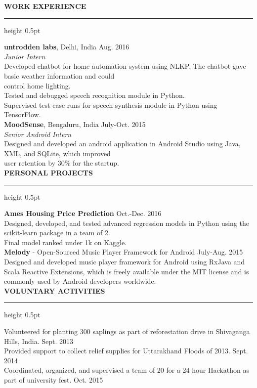 \documentclass[a4paper]{article}
\newcommand{\myline}{\par
  \kern2pt %
  \hrule height 0.5pt
  \kern2pt %
}
\newcommand{\mybullet}{
	\indent \textbullet \hspace*{2mm}
}
\begin{document}
	\smallskip
	\smallskip
	\noindent
	{\large \textbf{WORK EXPERIENCE}}
	\myline 
	\smallskip
	
	\noindent
	\textbf{untrodden labs}, Delhi, India \hfill Aug. 2016 \\
	\textit{Junior Intern}\\
	\mybullet Developed chatbot for home automation system using NLKP. The chatbot gave basic weather information and could\\
	\indent \indent control home lighting. \\
	\mybullet Tested and debugged speech recognition module in Python. \\
	\mybullet Supervised test case runs for speech synthesis module in Python using TensorFlow. \\
	
	\noindent
	\textbf{MoodSense}, Bengaluru, India \hfill July-Oct. 2015 \\
	\textit{Senior Android Intern} \\
	\mybullet Designed and developed an android application in Android Studio using Java, XML, and SQLite, which improved \\ 
	\indent\indent user retention by 30\% for the startup. \\
	
	\noindent
	{\large \textbf{PERSONAL PROJECTS}}
	\myline 
	\smallskip
	
	\noindent
	\textbf{Ames Housing Price Prediction} \hfill Oct.-Dec. 2016 \\
	\mybullet Designed, developed, and tested advanced regression models in Python using the scikit-learn package in a team of 2. \\
	\mybullet Final model ranked under 1k on Kaggle. \\
	
	\noindent
	\textbf{Melody} - Open-Sourced Music Player Framework for Android \hfill July-Aug. 2015 \\
	\mybullet Designed and developed music player framework for Android using RxJava and Scala Reactive Extensions, which is 
			freely \indent\indent available under the MIT license and is commonly used by Android developers worldwide. \\
	
	\noindent
	{\large \textbf{VOLUNTARY ACTIVITIES}}
	\myline 
	\smallskip
		
	\mybullet Volunteered for planting 300 saplings as part of reforestation drive in Shivaganga Hills, India. \hfill Sept. 2013 \\
	\mybullet Provided support to collect relief supplies for Uttarakhand Floods of 2013. \hfill Sept. 2014 \\
	\mybullet Coordinated, organized, and supervised a team of 20 for a 24 hour Hackathon as part of university fest. \hfill Oct. 2015 \\
	
\end{document}
